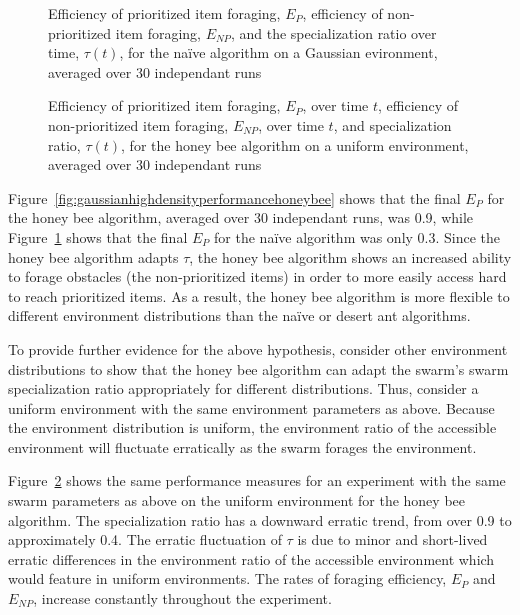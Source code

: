 \documentclass[preprint,12pt]{elsarticle}
\begin{document}
\begin{figure}[htb]
\centering
\small
\resizebox{\textwidth}{!}{}
\caption{Efficiency of prioritized item foraging, $E_P$, efficiency of non-prioritized item foraging, $E_{NP}$, and the specialization ratio over time, $\tau(t)$, for the na\"ive algorithm on a Gaussian evironment, averaged over 30 independant runs}
\label{fig:gaussianhighdensityperformancenaive}
\end{figure}

\begin{figure}[htb]
\centering
\small
\resizebox{\textwidth}{!}{}
\caption{Efficiency of prioritized item foraging, $E_P$, over time $t$, efficiency of non-prioritized item foraging, $E_{NP}$, over time $t$, and specialization ratio, $\tau(t)$, for the honey bee algorithm on a uniform environment, averaged over 30 independant runs}
\label{fig:uniformhighdensityperformancehoneybee}
\end{figure}


Figure~\ref{fig:gaussianhighdensityperformancehoneybee} shows that the final $E_P$ for the honey bee algorithm, averaged over 30 independant runs, was 0.9, while Figure~\ref{fig:gaussianhighdensityperformancenaive} shows that the final $E_P$ for the na\"ive algorithm was only 0.3. Since the honey bee algorithm adapts $\tau$, the honey bee algorithm shows an increased ability to forage obstacles (the non-prioritized items) in order to more easily access hard to reach prioritized items. As a result, the honey bee algorithm is more flexible to different environment distributions than the na\"ive or desert ant algorithms.


To provide further evidence for the above hypothesis, consider other environment distributions to show that the honey bee algorithm can adapt the swarm's swarm specialization ratio appropriately for different distributions. Thus, consider a uniform environment with the same environment parameters as above. Because the environment distribution is uniform, the environment ratio of the accessible environment will fluctuate erratically as the swarm forages the environment.  

Figure~\ref{fig:uniformhighdensityperformancehoneybee} shows the same performance measures for an experiment with the same swarm parameters as above on the uniform environment for the honey bee algorithm. The specialization ratio has a downward erratic trend, from over 0.9 to approximately 0.4. The erratic fluctuation of $\tau$ is due to minor and short-lived erratic differences in the environment ratio of the accessible environment which would feature in uniform environments. The rates of foraging efficiency, $E_P$ and $E_{NP}$, increase constantly throughout the experiment. 
\end{document}
